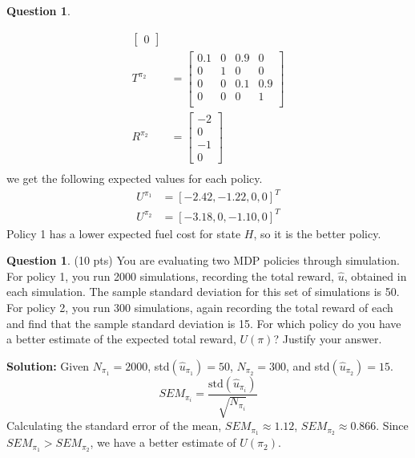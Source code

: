 \documentclass{article}
\theoremstyle{definition}
\newtheorem{question}[thm]{Question}
\begin{document}
\begin{question}
\begin{enumerate}[label=\alph*)]
\begin{align*}
\begin{bmatrix}
                0
            \end{bmatrix}\\
             T^{\pi_2} &= \begin{bmatrix}
                            0.1 & 0 & 0.9 & 0\\
                            0 & 1 & 0 & 0\\
                            0 & 0 & 0.1 & 0.9\\
                            0 & 0 & 0 & 1\\
                         \end{bmatrix}\\
            R^{\pi_2} &= 
            \begin{bmatrix}
                -2\\
                0\\
                -1\\
                0
            \end{bmatrix}\\
        \end{align*}
        we get the following expected values for each policy.
        \begin{align*}
            U^{\pi_1} &= [-2.42,-1.22,0,0]^T\\
            U^{\pi_2} &= [-3.18,0,-1.10,0]^T
        \end{align*}
        Policy 1 has a lower expected fuel cost for state $H$, so it is the better policy.
    \end{enumerate}
\end{question}



\clearpage

\begin{question} (10 pts)
You are evaluating two MDP policies through simulation. For policy 1, you run 2000 simulations, recording the total reward, $\hat{u}$, obtained in each simulation. The sample standard deviation for this set of simulations is 50. For policy 2, you run 300 simulations, again recording the total reward of each and find that the sample standard deviation is 15. For which policy do you have a better estimate of the expected total reward, $U(\pi)$? Justify your answer.
\end{question} 
\noindent \textbf{Solution: }
Given $N_{\pi_1} = 2000$, std$(\hat{u}_{\pi_1}) = 50$, $N_{\pi_2} = 300$, and std$(\hat{u}_{\pi_2}) = 15$.
\begin{equation*}
    SEM_{\pi_i} = \frac{\text{std}(\hat{u}_{\pi_i})}{\sqrt{N_{\pi_i}}}
\end{equation*}
Calculating the standard error of the mean, $SEM_{\pi_1} \approx 1.12$, $SEM_{\pi_2} \approx 0.866$. Since $SEM_{\pi_1} > SEM_{\pi_2}$, we have a better estimate of $\boxed{U(\pi_2)}$.
\end{document}
